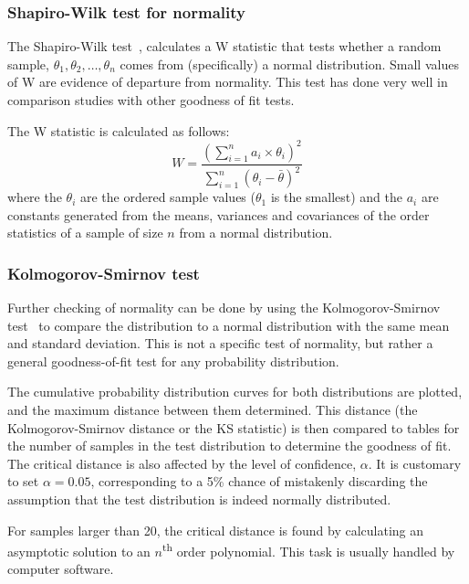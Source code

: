 \subsubsection{Shapiro-Wilk test for normality}\label{sec:shapiro-wilk-test}
The Shapiro-Wilk test~\citep{shapirowilk}, calculates a W statistic
that tests whether a random sample, $\theta_1, \theta_2, \dots,
\theta_n$ comes from (specifically) a normal distribution.  Small
values of W are evidence of departure from normality.  This test has
done very well in comparison studies with other goodness of fit tests.

The W statistic is calculated as follows: 
\begin{equation} 
  \label{eq:shipirowilk} 
  W = \frac{
    \left( \displaystyle \sum_{i=1}^n {a_i \times \theta_i} \right)^2}
  {\displaystyle \sum_{i=1}^n 
    \left ( \theta_i - \bar{\theta} \right )^2}
\end{equation}
where the $\theta_i$ are the ordered sample values ($\theta_1$ is the
smallest) and the $a_i$ are constants generated from the means,
variances and covariances of the order statistics of a sample of size
$n$ from a normal distribution.

\subsubsection{Kolmogorov-Smirnov test}\label{sec:kolm-smirn-test}
Further checking of normality can be done by using the
Kolmogorov-Smirnov test~\citep[392--394]{chakravartistat} to compare
the distribution to a normal distribution with the same mean and
standard deviation.  This is not a specific test of normality, but
rather a general goodness-of-fit test for any probability
distribution.

The cumulative probability distribution curves for both distributions
are plotted, and the maximum distance between them determined.  This
distance (the Kolmogorov-Smirnov distance or the KS statistic) is then
compared to tables for the number of samples in the test distribution
to determine the goodness of fit.  The critical distance is also
affected by the level of confidence, $\alpha$.  It is customary to set
$\alpha=\num{0.05}$, corresponding to a 5\% chance of mistakenly
discarding the assumption that the test distribution is indeed
normally distributed.

For samples larger than 20, the critical distance is found by
calculating an asymptotic solution to an $n$\textsuperscript{th} order
polynomial.  This task is usually handled by computer software.

